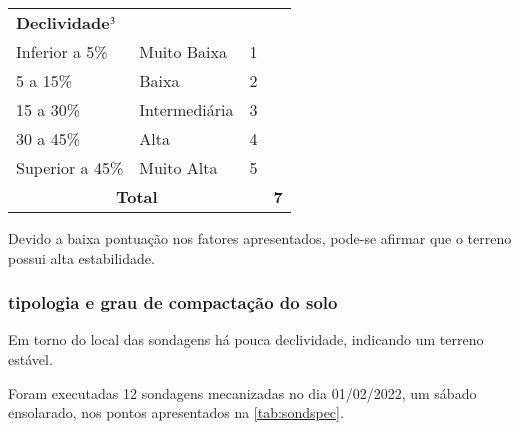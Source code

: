 \begin{table}[htb!]
\begin{tabularx}{\textwidth}{@{\hspace{1cm}}Xlcc}
		\multicolumn{3}{l}{\bfseries Declividade$\footnotesize^3$}\\\cmidrule{1-1}
		Inferior a 5\% & Muito Baixa & 1& \Square\\
		5 a 15\% & Baixa & 2& \CheckedBox\\
		15 a 30\% & Intermediária & 3& \Square\\
		30 a 45\% & Alta & 4& \Square\\
		Superior a 45\% & Muito Alta & 5& \Square\\
		\midrule
		\multicolumn{3}{c}{\bfseries Total} & \bfseries7\\
		
		\bottomrule
	\end{tabularx}
\end{table}

\FloatBarrier

Devido a baixa pontuação nos fatores apresentados, pode-se afirmar que o terreno possui alta estabilidade.

\subsubsection{tipologia e grau de compactação do solo}

Em torno do local das sondagens há pouca declividade,
indicando um terreno estável.

Foram executadas 12 sondagens mecanizadas no dia
01/02/2022, um sábado ensolarado, nos pontos
apresentados na \cref{tab:sondspec}.

